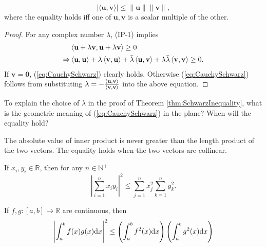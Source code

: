 \begin{thm}
  \label{thm:SchwarzInequality}
  \begin{equation}
    \label{eq:CauchySchwarz}
    |\langle \mathbf{u},\mathbf{v}\rangle|
    \le \|\mathbf{u}\| \|\mathbf{v}\|,
  \end{equation}
  where the equality holds iff one of $\mathbf{u}, \mathbf{v}$
  is a scalar multiple of the other.
\end{thm}
\begin{proof}
  For any complex number $\lambda$, (IP-1) implies
  \begin{align*}
    & \left\langle \mathbf{u}+\lambda \mathbf{v}, \mathbf{u}+\lambda \mathbf{v} \right\rangle\ge 0
    \\ \Rightarrow
    & 
      \left\langle \mathbf{u}, \mathbf{u} \right\rangle + \lambda\left\langle  \mathbf{v}, \mathbf{u} \right\rangle
      + \bar{\lambda}\left\langle \mathbf{u}, \mathbf{v} \right\rangle+\lambda\bar{\lambda}\left\langle \mathbf{v},\mathbf{v} \right\rangle\ge 0.
  \end{align*}
  If $\mathbf{v}=\mathbf{0}$, (\ref{eq:CauchySchwarz}) clearly holds.
  Otherwise (\ref{eq:CauchySchwarz}) follows from substituting
  \mbox{$\lambda=-\frac{\left\langle \mathbf{u},\mathbf{v} \right\rangle}{\left\langle \mathbf{v},\mathbf{v} \right\rangle}$}
  into the above equation.
\end{proof}

\begin{exc}
  To explain the choice of $\lambda$ in the proof
  of Theorem \ref{thm:SchwarzInequality}, 
  what is the geometric meaning of (\ref{eq:CauchySchwarz})
  in the plane? When will the equality hold?
\end{exc}
\begin{solution}
  The absolute value of inner product
  is never greater than the length product of the two vectors.
  The equality holds when the two vectors are collinear.
\end{solution}

\begin{exm}
  \label{exm:CS1}
  If $x_i,y_i\in \mathbb{R}$, then for any $n\in \mathbb{N}^+$
  \begin{equation*}
    \left|\sum_{i=1}^n x_iy_i\right|^2
    \le \sum_{j=1}^nx_j^2 \sum_{k=1}^ny_k^2.
  \end{equation*}
\end{exm}

\begin{exm}
  \label{exm:CS2}
  If $f,g: [a,b]\rightarrow \mathbb{R}$ are continuous, then
  \begin{equation*}
    \left|\int_{a}^{b} f(x) g(x) \mathrm{d} x\right|^2
    \le      
    \left(\int_{a}^{b} f^2(x) \mathrm{d} x\right)
    \left(\int_{a}^{b} g^2(x) \mathrm{d} x\right)
  \end{equation*}
\end{exm}

